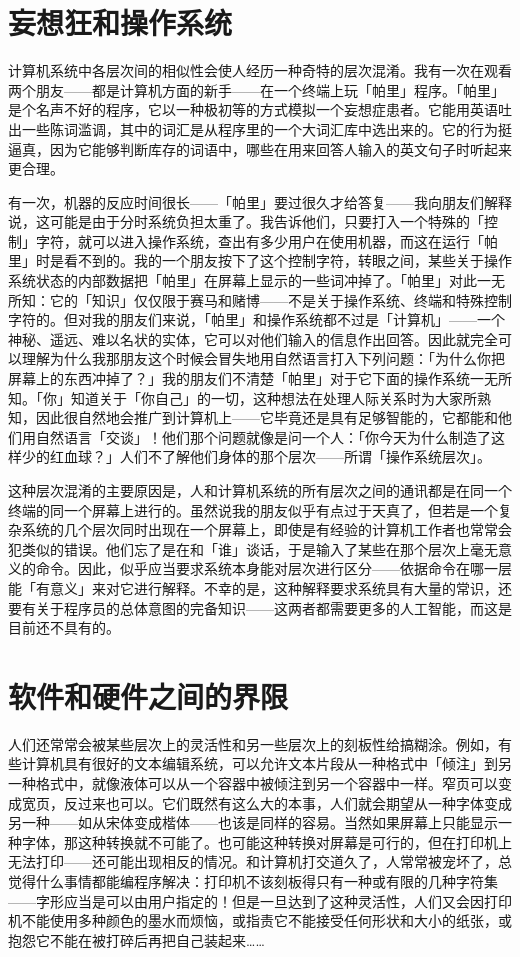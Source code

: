 \documentclass[
  12pt,
  twoside,
  openright,
  oldfontcommands,
]{memoir}
\begin{document}
\section{妄想狂和操作系统}

计算机系统中各层次间的相似性会使人经历一种奇特的层次混淆。我有一次在观看两个朋友------都是计算机方面的新手------在一个终端上玩「帕里」程序。「帕里」是个名声不好的程序，它以一种极初等的方式模拟一个妄想症患者。它能用英语吐出一些陈词滥调，其中的词汇是从程序里的一个大词汇库中选出来的。它的行为挺逼真，因为它能够判断库存的词语中，哪些在用来回答人输入的英文句子时听起来更合理。

有一次，机器的反应时间很长------「帕里」要过很久才给答复------我向朋友们解释说，这可能是由于分时系统负担太重了。我告诉他们，只要打入一个特殊的「控制」字符，就可以进入操作系统，查出有多少用户在使用机器，而这在运行「帕里」时是看不到的。我的一个朋友按下了这个控制字符，转眼之间，某些关于操作系统状态的内部数据把「帕里」在屏幕上显示的一些词冲掉了。「帕里」对此一无所知：它的「知识」仅仅限于赛马和赌博------不是关于操作系统、终端和特殊控制字符的。但对我的朋友们来说，「帕里」和操作系统都不过是「计算机」------一个神秘、遥远、难以名状的实体，它可以对他们输入的信息作出回答。因此就完全可以理解为什么我那朋友这个时候会冒失地用自然语言打入下列问题：「为什么你把屏幕上的东西冲掉了？」我的朋友们不清楚「帕里」对于它下面的操作系统一无所知。「你」知道关于「你自己」的一切，这种想法在处理人际关系时为大家所熟知，因此很自然地会推广到计算机上------它毕竟还是具有足够智能的，它都能和他们用自然语言「交谈」！他们那个问题就像是问一个人：「你今天为什么制造了这样少的红血球？」人们不了解他们身体的那个层次------所谓「操作系统层次」。

这种层次混淆的主要原因是，人和计算机系统的所有层次之间的通讯都是在同一个终端的同一个屏幕上进行的。虽然说我的朋友似乎有点过于天真了，但若是一个复杂系统的几个层次同时出现在一个屏幕上，即使是有经验的计算机工作者也常常会犯类似的错误。他们忘了是在和「谁」谈话，于是输入了某些在那个层次上毫无意义的命令。因此，似乎应当要求系统本身能对层次进行区分------依据命令在哪一层能「有意义」来对它进行解释。不幸的是，这种解释要求系统具有大量的常识，还要有关于程序员的总体意图的完备知识------这两者都需要更多的人工智能，而这是目前还不具有的。

\section{软件和硬件之间的界限}

人们还常常会被某些层次上的灵活性和另一些层次上的刻板性给搞糊涂。例如，有些计算机具有很好的文本编辑系统，可以允许文本片段从一种格式中「倾注」到另一种格式中，就像液体可以从一个容器中被倾注到另一个容器中一样。窄页可以变成宽页，反过来也可以。它们既然有这么大的本事，人们就会期望从一种字体变成另一种------如从宋体变成楷体------也该是同样的容易。当然如果屏幕上只能显示一种字体，那这种转换就不可能了。也可能这种转换对屏幕是可行的，但在打印机上无法打印------还可能出现相反的情况。和计算机打交道久了，人常常被宠坏了，总觉得什么事情都能编程序解决：打印机不该刻板得只有一种或有限的几种字符集------字形应当是可以由用户指定的！但是一旦达到了这种灵活性，人们又会因打印机不能使用多种颜色的墨水而烦恼，或指责它不能接受任何形状和大小的纸张，或抱怨它不能在被打碎后再把自己装起来\ldots\ldots{}
\end{document}
